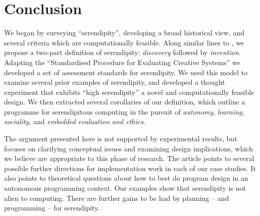 \section{Conclusion} \label{sec:conclusion}

%
We began by surveying ``serendipity'', developing a broad historical
view, and several criteria which are computationally feasible.  Along
similar lines to , we propose a two-part
definition of serendipity: \emph{discovery} followed by
\emph{invention}.
%
Adapting the ``Standardised Procedure for Evaluating Creative
Systems'' we developed a set of assessment standards for serendipity.
%
We used this model to examine several prior examples of serendipity,
and developed a thought experiment that exhibits ``high serendipity''
a novel and computationally feasible design.
%
We then extracted several corollaries of our definition, which outline
a programme for serendipitous computing in the pursuit of
\emph{autonomy}, \emph{learning}, \emph{sociality}, and \emph{embedded
  evaluation and ethics}.

The argument presented here is not supported by experimental results,
but focuses on clarifying conceptual issues and examining design
implications, which we believe are appropriate to this phase of
research.
% 
The article points to several possible further directions for
implementation work in each of our case studies.  It also points to
theoretical questions about how to best do program design in an
autonomous programming context.  Our examples show that serendipity is
not alien to computing.  There are further gains to be had by planning
-- and programming -- for serendipity.
%

